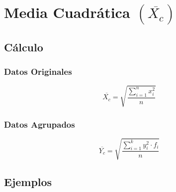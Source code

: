 \section{Media Cuadrática $(\overline{X_c})$}
\subsection{Cálculo}
\subsubsection{Datos Originales}
$$\overline{X_c}=\sqrt{\dfrac{\displaystyle\sum_{i=1}^{n}x_i^2}{n}}$$
\subsubsection{Datos Agrupados}
$$\overline{Y_c}=\sqrt{\dfrac{\displaystyle\sum_{i=1}^{k}y_i^2\cdot f_i}{n}}$$
\subsection{Ejemplos}